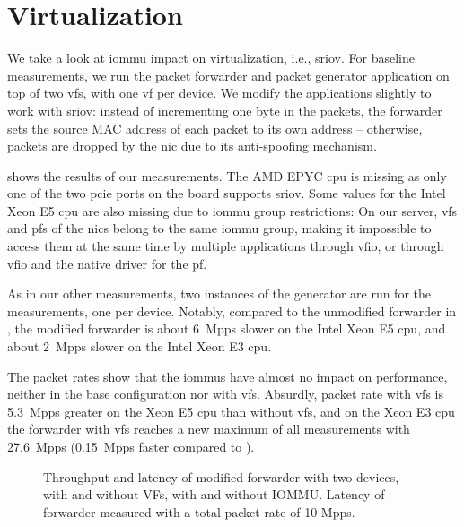 \section{Virtualization}
\label{sec:virtualization}

We take a look at \ac{iommu} impact on virtualization, i.e., \ac{sriov}. For
baseline measurements, we run the packet forwarder and packet generator
application on top of two \acp{vf}, with one \ac{vf} per device. We modify the
applications slightly to work with \ac{sriov}: instead of incrementing one byte
in the packets, the forwarder sets the source MAC address of each packet to its
own address -- otherwise, packets are dropped by the \ac{nic} due to its
anti-spoofing mechanism.

 shows the results of our measurements. The AMD EPYC
\ac{cpu} is missing as only one of the two \ac{pcie} ports on the board supports
\ac{sriov}. Some values for the Intel Xeon E5 \ac{cpu} are also missing due to
\ac{iommu} group restrictions: On our server, \acp{vf} and \acp{pf} of the
\acp{nic} belong to the same \ac{iommu} group, making it impossible to access
them at the same time by multiple applications through \ac{vfio}, or through
\ac{vfio} and the native driver for the \ac{pf}.

As in our other measurements, two instances of the generator are run for the
measurements, one per device. Notably, compared to the unmodified forwarder in
, the modified forwarder is about 6~Mpps
slower on the Intel Xeon E5 \ac{cpu}, and about 2~Mpps slower on the Intel Xeon
E3 \ac{cpu}.

The packet rates show that the \acp{iommu} have almost no impact on performance,
neither in the base configuration nor with \acp{vf}. Absurdly, packet rate with
\acp{vf} is 5.3~Mpps greater on the Xeon E5 \ac{cpu} than without \acp{vf}, and
on the Xeon E3 \ac{cpu} the forwarder with \acp{vf} reaches a new maximum of all
measurements with 27.6~Mpps (0.15~Mpps faster compared to
).

\begin{figure}%
	\centering
    \par

    \caption{Throughput and latency of modified forwarder with two devices, with
    and without VFs, with and without IOMMU. Latency of forwarder measured with
    a total packet rate of 10 Mpps.}
	\label{fig:sriov-baseline}
\end{figure}

